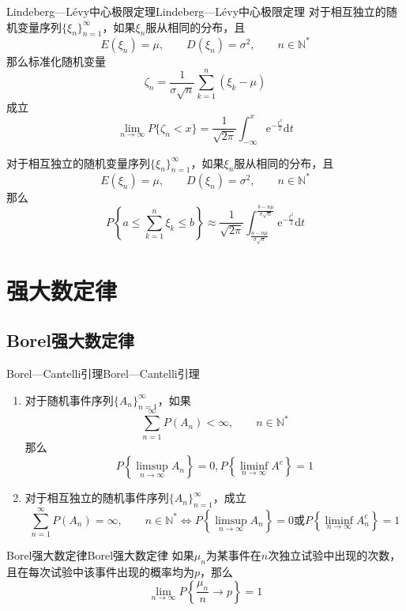 \documentclass[lang = cn, scheme = chinese, thmcnt = section]{elegantbook}
\newcommand{\N}{\mathbb{N}}            %
\begin{document}
\begin{theorem}{Lindeberg—Lévy中心极限定理}{Lindeberg—Lévy中心极限定理}
	对于相互独立的随机变量序列$\{ \xi_n \}_{n=1}^{\infty}$，如果$\xi_n$服从相同的分布，且
	$$
	E(\xi_n)=\mu,\qquad 
	D(\xi_n)=\sigma^2,\qquad
	n\in\N^*
	$$
	那么标准化随机变量
	$$
	\zeta_n=\frac{1}{\sigma\sqrt{n}}\sum_{k=1}^{n}{(\xi_k-\mu)}
	$$
	成立
	$$
	\lim_{n\to\infty}{P\{\zeta_n<x\}}=\frac{1}{\sqrt{2\pi}}\int_{-\infty}^{x}{\mathrm{e}^{-\frac{t^2}{2}}\mathrm{d}t}
	$$
\end{theorem}

\begin{corollary}
	对于相互独立的随机变量序列$\{ \xi_n \}_{n=1}^{\infty}$，如果$\xi_n$服从相同的分布，且
	$$
	E(\xi_n)=\mu,\qquad 
	D(\xi_n)=\sigma^2,\qquad
	n\in\N^*
	$$
	那么
	$$
	P\left\{a\le\sum_{k=1}^{n}{\xi_k}\le b\right\}\approx\frac{1}{\sqrt{2\pi}}\int_{\frac{a-n\mu}{\sigma\sqrt{n}}}^{\frac{b-n\mu}{\sigma\sqrt{n}}}{\mathrm{e}^{-\frac{t^2}{2}}\mathrm{d}t}
	$$
\end{corollary}

\section{强大数定律}

\subsection{Borel强大数定律}

\begin{theorem}{Borel—Cantelli引理}{Borel—Cantelli引理}
	\begin{enumerate}
		\item 对于随机事件序列$\{A_n\}_{n=1}^{\infty}$，如果
		$$
		\sum_{n=1}^{\infty}{P(A_n)}<\infty,\qquad n\in\N^*
		$$
		那么
		$$
		P\left\{\limsup_{n\to\infty}{A_n}\right\}=0,
		P\left\{\liminf_{n\to\infty}A^c\right\}=1
		$$
		\item 对于相互独立的随机事件序列$\{A_n\}_{n=1}^{\infty}$，成立
		$$
		\sum_{n=1}^{\infty}{P(A_n)}=\infty,\qquad n\in\N^*
		\iff
		P\left\{\limsup_{n\to\infty}{A_n}\right\}=0
		\text{或}
		P\left\{\liminf_{n\to\infty}{A_n^c}\right\}=1
		$$
	\end{enumerate}
\end{theorem}

\begin{theorem}{Borel强大数定律}{Borel强大数定律}
	如果$\mu_n$为某事件在$n$次独立试验中出现的次数，且在每次试验中该事件出现的概率均为$p$，那么
	$$
	\lim_{n\to\infty}P\left\{\frac{\mu_n}{n}\to p\right\}=1
	$$
\end{theorem}
\end{document}
